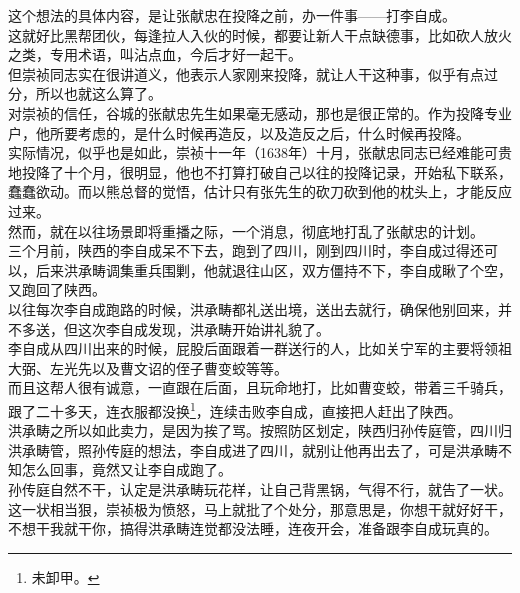 \begin{multicols}{\theparacolNo}
这个想法的具体内容，是让张献忠在投降之前，办一件事——打李自成。\\

这就好比黑帮团伙，每逢拉人入伙的时候，都要让新人干点缺德事，比如砍人放火之类，专用术语，叫沾点血，今后才好一起干。\\

但崇祯同志实在很讲道义，他表示人家刚来投降，就让人干这种事，似乎有点过分，所以也就这么算了。\\

对崇祯的信任，谷城的张献忠先生如果毫无感动，那也是很正常的。作为投降专业户，他所要考虑的，是什么时候再造反，以及造反之后，什么时候再投降。\\

实际情况，似乎也是如此，崇祯十一年（1638年）十月，张献忠同志已经难能可贵地投降了十个月，很明显，他也不打算打破自己以往的投降记录，开始私下联系，蠢蠢欲动。而以熊总督的觉悟，估计只有张先生的砍刀砍到他的枕头上，才能反应过来。\\

然而，就在以往场景即将重播之际，一个消息，彻底地打乱了张献忠的计划。\\

三个月前，陕西的李自成呆不下去，跑到了四川，刚到四川时，李自成过得还可以，后来洪承畴调集重兵围剿，他就退往山区，双方僵持不下，李自成瞅了个空，又跑回了陕西。\\

以往每次李自成跑路的时候，洪承畴都礼送出境，送出去就行，确保他别回来，并不多送，但这次李自成发现，洪承畴开始讲礼貌了。\\

李自成从四川出来的时候，屁股后面跟着一群送行的人，比如关宁军的主要将领祖大弼、左光先以及曹文诏的侄子曹变蛟等等。\\

而且这帮人很有诚意，一直跟在后面，且玩命地打，比如曹变蛟，带着三千骑兵，跟了二十多天，连衣服都没换\footnote{未卸甲。}，连续击败李自成，直接把人赶出了陕西。\\

洪承畴之所以如此卖力，是因为挨了骂。按照防区划定，陕西归孙传庭管，四川归洪承畴管，照孙传庭的想法，李自成进了四川，就别让他再出去了，可是洪承畴不知怎么回事，竟然又让李自成跑了。\\

孙传庭自然不干，认定是洪承畴玩花样，让自己背黑锅，气得不行，就告了一状。\\

这一状相当狠，崇祯极为愤怒，马上就批了个处分，那意思是，你想干就好好干，不想干我就干你，搞得洪承畴连觉都没法睡，连夜开会，准备跟李自成玩真的。\\


\end{multicols}
